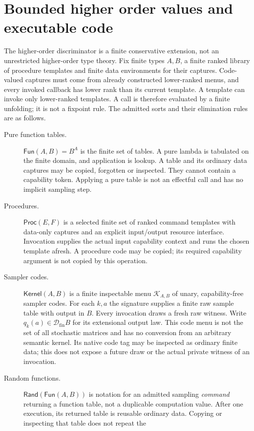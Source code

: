 \documentclass[11pt,a4paper]{article}
\theoremstyle{definition}
\newcommand{\Fun}{\mathsf{Fun}}
\newcommand{\Proc}{\mathsf{Proc}}
\newcommand{\Kernel}{\mathsf{Kernel}}
\newcommand{\Rand}{\mathsf{Rand}}
\begin{document}
\section{Bounded higher order values and executable code}\label{sec:higher}
The higher-order discriminator is a finite conservative extension, not an
unrestricted higher-order type theory. Fix finite types $A,B$, a finite
ranked library of procedure templates and finite data environments for their
captures. Code-valued captures must come from already constructed lower-ranked menus,
and every invoked callback has lower rank than its current template.
A template can invoke only lower-ranked templates. A call is
therefore evaluated by a finite unfolding; it is not a fixpoint rule.
The admitted sorts and their elimination rules are as follows.

\begin{description}
\item[Pure function tables.] $\Fun(A,B)=B^A$ is the finite set of tables.
A pure lambda is tabulated on the finite domain, and application is
lookup. A table and its ordinary data captures may be copied, forgotten
or inspected. They cannot contain a capability token. Applying a pure
table is not an effectful call and has no implicit sampling step.
\item[Procedures.] $\Proc(E,F)$ is a selected finite set of ranked command
templates with data-only captures and an explicit input/output resource
interface. Invocation supplies the actual input capability context and
runs the chosen template afresh. A procedure code may be copied; its
required capability argument is not copied by this operation.
\item[Sampler codes.] $\Kernel(A,B)$ is a finite inspectable menu
$\mathcal K_{A,B}$ of unary, capability-free sampler codes. For each
$k,a$ the signature supplies a finite raw sample table with output in $B$.
Every invocation draws a fresh raw witness. Write
$q_k(a)\in\mathcal D_{\mathrm{fin}}B$ for its extensional output law.
This code menu is not the set of all stochastic matrices and has no
conversion from an arbitrary semantic kernel. Its native code tag may be inspected as ordinary finite data; this does
not expose a future draw or the actual private witness of an invocation.
\item[Random functions.] $\Rand(\Fun(A,B))$ is notation for an admitted
sampling \emph{command} returning a function table, not a duplicable
computation value. After one execution, its returned table is reusable
ordinary data. Copying or inspecting that table does not repeat the

\end{description}
\end{document}
